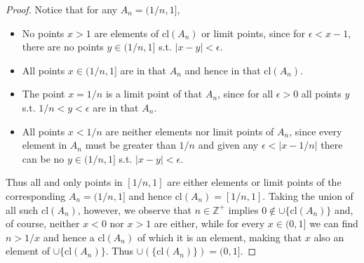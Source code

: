 \begin{proof}
Notice that for any $A_n=(1/n,1]$,
\begin{itemize}
\item No points $x>1$ are elements of $\text{cl}(A_n)$ or limit points, since for $\epsilon < x-1$, there are no points $y\in (1/n,1]$ s.t. $|x-y|<\epsilon$.
\item All points $x\in(1/n,1]$ are in that $A_n$ and hence in that $\text{cl}(A_n)$.
\item The point $x=1/n$ is a limit point of that $A_n$, since for all $\epsilon > 0$ all points $y$ s.t. $1/n < y < \epsilon$ are in  that $A_n$.
\item All points $x< 1/n$ are neither elements nor limit points of $A_n$, since every element in $A_n$ must be greater than $1/n$ and given any $\epsilon < |x-1/n|$ there can be no $y\in (1/n,1]$ s.t. $|x-y|<\epsilon$.
\end{itemize}

Thus all and only points in $[1/n,1]$ are either elements or limit points of the corresponding $A_n=(1/n,1]$ and hence $\text{cl}(A_n)=[1/n,1]$. Taking the union of all such $\text{cl}(A_n)$, however, we observe that $n\in\mathbb{Z}^{+}$ implies $0\notin\cup\{\text{cl}(A_n)\}$ and, of course, neither $x< 0$ nor $x>1$ are either, while for every $x\in(0,1]$ we can find $n>1/x$ and hence a $\text{cl}(A_n)$ of which it is an element, making that $x$ also an element of $\cup\{\text{cl}(A_n)\}$. Thus $\cup(\{\text{cl}(A_n)\})=(0,1]$.
\end{proof}

